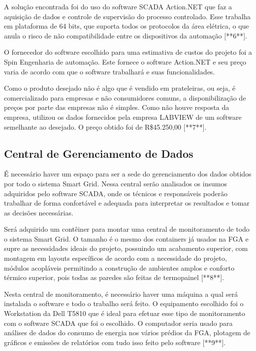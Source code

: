 A solução encontrada foi do uso do software SCADA Action.NET que faz a aquisição de dados e controle de supervisão do processo controlado. Esse trabalha em plataforma de 64 bits, que suporta todos os protocolos da área elétrica, o que anula o risco de não compatibilidade entre os dispositivos da automação [**6**].

O fornecedor do software escolhido para uma estimativa de custos do projeto foi a Spin Engenharia de automação. Este fornece o software Action.NET e seu preço varia de acordo com que o software trabalhará e suas funcionalidades.

Como o produto desejado não é algo que é vendido em prateleiras, ou seja, é comercializado para empresas e não consumidores comuns, a disponibilização de preços por parte das empresas não é simples. Como não houve resposta da empresa, utilizou os dados fornecidos pela empresa LABVIEW de um software semelhante ao desejado. O preço obtido foi de R\$45.250,00 [**7**].

\subsection{Central de Gerenciamento de Dados}
É necessário haver um espaço para ser a sede do gerenciamento dos dados obtidos por todo o sistema Smart Grid. Nessa central serão analisados os insumos adquiridos pelo software SCADA, onde os técnicos e responsáveis poderão trabalhar de forma confortável e adequada para interpretar os resultados e tomar as decisões necessárias. 

Será adquirido um contêiner para montar uma central de monitoramento de todo o sistema Smart Grid. O tamanho é o mesmo dos containers já usados na FGA e supre as necessidades ideais do projeto, possuindo um acabamento superior, com montagem em layouts específicos de acordo com a necessidade do projeto, módulos acopláveis permitindo a construção de ambientes amplos e conforto térmico superior, pois todas as paredes são feitas de termopainel [**8**]. 

Nesta central de monitoramento, é necessário haver uma máquina a qual será instalada o software e todo o trabalho será feito. O equipamento escolhido foi o Workstation da Dell T5810 que é ideal para efetuar esse tipo de monitoramento com o software SCADA que foi o escolhido. O computador seria usado para análises de dados do consumo de energia nos vários prédios da FGA, plotagem de gráficos e emissões de relatórios com tudo isso feito pelo software [**9**].

